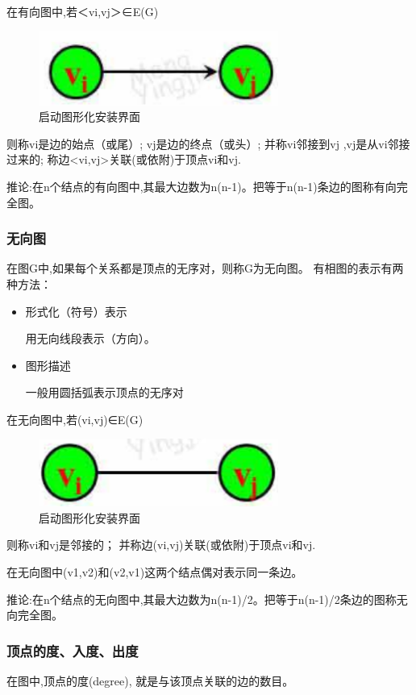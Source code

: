 \documentclass[AutoFakeBold]{LZUThesis2007}
\begin{document}
在有向图中,若＜vi,vj＞∈E(G)
\begin{figure}[H]
    \centering
    \includegraphics[width=0.7\textwidth]{figures/8.3.png}
    \caption{启动图形化安装界面}
    \label{fig_install_texlive}
\end{figure}
则称vi是边的始点（或尾）; vj是边的终点（或头）; 并称vi邻接到vj ,vj是从vi邻接过来的; 称边<vi,vj>关联(或依附)于顶点vi和vj.

推论:在n个结点的有向图中,其最大边数为n(n-1)。把等于n(n-1)条边的图称有向完全图。

			\subsubsection{无向图}
在图G中,如果每个关系都是顶点的无序对，则称G为无向图。
有相图的表示有两种方法：
	\begin{itemize}
		\item 形式化（符号）表示
	
	用无向线段表示（方向）。
		\item 图形描述
	
	一般用圆括弧表示顶点的无序对
	\end{itemize}

在无向图中,若(vi,vj)∈E(G)
\begin{figure}[H]
    \centering
    \includegraphics[width=0.7\textwidth]{figures/8.4.png}
    \caption{启动图形化安装界面}
    \label{fig_install_texlive}
\end{figure}
则称vi和vj是邻接的； 并称边(vi,vj)关联(或依附)于顶点vi和vj.

在无向图中(v1,v2)和(v2,v1)这两个结点偶对表示同一条边。

推论:在n个结点的无向图中,其最大边数为n(n-1)/2。把等于n(n-1)/2条边的图称无向完全图。

			\subsubsection{顶点的度、入度、出度}
在图中,顶点的度(degree), 就是与该顶点关联的边的数目。
\end{document}
